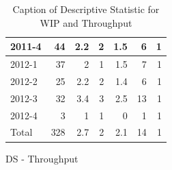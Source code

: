 \documentclass[UKenglish]{ifimaster}  %
\begin{document}
\begin{appendices}
\begin{table}[!htbp]
\begin{adjustwidth}{-2.5cm}{}
\begin{subfigure}[b]{0.3\textwidth}
{\begin{tabular}{ | l | r | r | r | r | r | r | }
 2011-4  & 44 & 2.2 & 2 & 1.5 & 6 & 1 \\ \hline
 2012-1  & 37 & 2 & 1 & 1.5 & 7 & 1 \\ \hline
 2012-2  & 25 & 2.2 & 2 & 1.4 & 6 & 1 \\ \hline
 2012-3  & 32 & 3.4 & 3 & 2.5 & 13 & 1 \\ \hline
 2012-4  & 3 & 1 & 1 & 0 &1 & 1 \\ \hline
 Total  & 328 & 2.7 & 2 & 2.1 & 14 & 1 \\ \hline
\end{tabular}
}
\caption{DS - Throughput}
 \label{DS:Throughput:7}
\end{subfigure}
\end{adjustwidth}
\caption[Optional caption for list of figures]{Caption of Descriptive Statistic for WIP and Throughput}
\label{DS:7:1}
\end{table}


\end{appendices}
\end{document}
